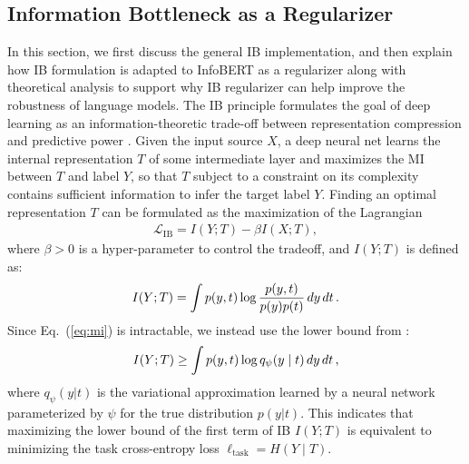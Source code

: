 \documentclass{article} \usepackage{iclr2021_conference,times}
\theoremstyle{definition}
\theoremstyle{remark}
\newcommand{\method}{InfoBERT\xspace}
\newcommand{\modified}[1]{{\color{black}{#1}}}
\begin{document}
\subsection{Information Bottleneck as a Regularizer}
In this section, we first discuss the general IB implementation, and then explain how IB formulation is adapted to \method as a regularizer  along with  theoretical analysis to support why IB regularizer can help improve the robustness of language models.
The IB principle formulates the goal of deep learning as an information-theoretic trade-off between representation compression and predictive power \citep{deepib}. Given the input source $X$, a deep neural net learns the internal representation $T$ of some intermediate layer and maximizes the MI between $T$ and label $Y$, so that $T$ subject to a constraint on its complexity contains sufficient information to infer the target label $Y$. Finding an optimal representation $T$ can be formulated as the maximization of
the Lagrangian
\begin{align} 
    \label{eq:ib}
    \mathcal{L}_{\text{IB}} = I(Y; T) - \beta I(X; T),
\end{align}
where $\beta > 0$ is a hyper-parameter to control the tradeoff, and  $I(Y;T)$ is defined as: 
\begin{align}
    \label{eq:mi}
    I(Y; T) = \int p(y, t) \log \frac{p(y,t)}{p(y)p(t)} \, \modified{dy \, dt \,}.
\end{align}
Since Eq.~(\ref{eq:mi}) is intractable, we instead use the lower bound from \citet{Barber2003TheIA}: 
\begin{align}
    \label{eq:lower}
    I(Y; T) \ge \int p(y, t) \log q_\psi(y \mid t) \, \modified{dy \, dt \,},
\end{align}
where  $q_\psi(y|t)$ is the variational approximation learned by a neural network parameterized by $\psi$ for the true distribution $p(y|t)$. This indicates that maximizing the lower bound of the first term of IB $I(Y; T)$ is equivalent to minimizing the task cross-entropy loss $\ell_{\text{task}} = H(Y \mid T)$. 
\end{document}
